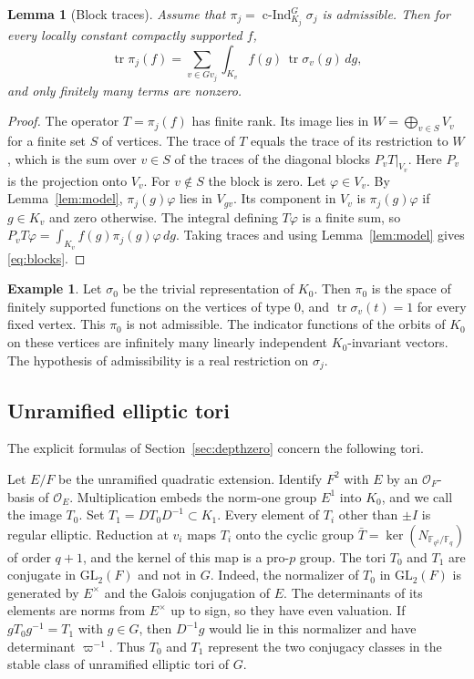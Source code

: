 \documentclass[12pt,letterpaper]{article}
\numberwithin{equation}{section}
\newtheorem{lemma}[theorem]{Lemma}
\theoremstyle{definition}
\newtheorem{example}[theorem]{Example}
\theoremstyle{remark}
\newcommand{\OO}{\mathcal O_F}
\newcommand{\OEr}{\mathcal O_E}
\newcommand{\kk}{\mathbb F_q}
\newcommand{\cInd}{\operatorname{c-Ind}}
\newcommand{\tr}{\operatorname{tr}}
\begin{document}
\begin{lemma}[Block traces]\label{lem:blocks}
Assume that $\pi_j=\cInd_{K_j}^G\sigma_j$ is admissible. Then for every locally constant compactly supported $f$,
\begin{equation}\label{eq:blocks}
 \tr\pi_j(f)=\sum_{v\in Gv_j}\int_{K_v}f(g)\,\tr\sigma_v(g)\,dg ,
\end{equation}
and only finitely many terms are nonzero.
\end{lemma}
\begin{proof}
The operator $T=\pi_j(f)$ has finite rank. Its image lies in $W=\bigoplus_{v\in S}V_v$ for a finite set $S$ of vertices. The trace of $T$ equals the trace of its restriction to $W$, which is the sum over $v\in S$ of the traces of the diagonal blocks $P_vT|_{V_v}$. Here $P_v$ is the projection onto $V_v$. For $v\notin S$ the block is zero. Let $\varphi\in V_v$. By Lemma~\ref{lem:model}, $\pi_j(g)\varphi$ lies in $V_{gv}$. Its component in $V_v$ is $\pi_j(g)\varphi$ if $g\in K_v$ and zero otherwise. The integral defining $T\varphi$ is a finite sum, so $P_vT\varphi=\int_{K_v}f(g)\pi_j(g)\varphi\,dg$. Taking traces and using Lemma~\ref{lem:model} gives \eqref{eq:blocks}.
\end{proof}

\begin{example}\label{ex:nonadm}
Let $\sigma_0$ be the trivial representation of $K_0$. Then $\pi_0$ is the space of finitely supported functions on the vertices of type $0$, and $\tr\sigma_v(t)=1$ for every fixed vertex. This $\pi_0$ is not admissible. The indicator functions of the orbits of $K_0$ on these vertices are infinitely many linearly independent $K_0$-invariant vectors. The hypothesis of admissibility is a real restriction on $\sigma_j$.
\end{example}

\subsection*{Unramified elliptic tori}
The explicit formulas of Section~\ref{sec:depthzero} concern the following tori.

Let $E/F$ be the unramified quadratic extension. Identify $F^2$ with $E$ by an $\OO$-basis of $\OEr$. Multiplication embeds the norm-one group $E^1$ into $K_0$, and we call the image $T_0$. Set $T_1=DT_0D^{-1}\subset K_1$. Every element of $T_i$ other than $\pm I$ is regular elliptic. Reduction at $v_i$ maps $T_i$ onto the cyclic group $\bar T=\ker(N_{\mathbb F_{q^2}/\kk})$ of order $q+1$, and the kernel of this map is a pro-$p$ group. The tori $T_0$ and $T_1$ are conjugate in $\mathrm{GL}_2(F)$ and not in $G$. Indeed, the normalizer of $T_0$ in $\mathrm{GL}_2(F)$ is generated by $E^\times$ and the Galois conjugation of $E$. The determinants of its elements are norms from $E^\times$ up to sign, so they have even valuation. If $gT_0g^{-1}=T_1$ with $g\in G$, then $D^{-1}g$ would lie in this normalizer and have determinant $\varpi^{-1}$. Thus $T_0$ and $T_1$ represent the two conjugacy classes in the stable class of unramified elliptic tori of $G$.
\end{document}
